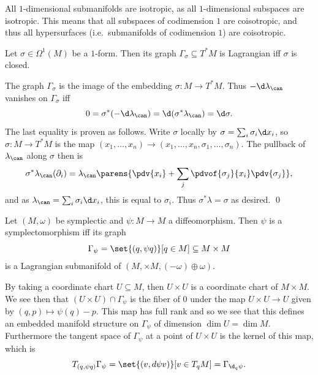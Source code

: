 \eexam

\bexam

    All $1$-dimensional submanifolds are isotropic, as all $1$-dimensional subspaces are isotropic.
    This means that all subspaces of codimension $1$ are coisotropic, and thus all hypersurfaces (i.e.\ submanifolds of codimension $1$) are coisotropic.

\eexam

\bprop[name={closedformlagrange}]

    Let $\sigma\in\Omega^1(M)$ be a $1$-form.
    Then its graph $\Gamma_\sigma\subseteq T^*M$ is Lagrangian iff $\sigma$ is closed.

\eprop

\bproof

    The graph $\Gamma_\sigma$ is the image of the embedding $\sigma\colon M\to T^*M$.
    Thus $-\d\lambda_\can$ vanishes on $\Gamma_\sigma$ iff
    $$ 0 = \sigma^*(-\d\lambda_\can) = \d(\sigma^*\lambda_\can) = \d\sigma . $$
    The last equality is proven as follows.
    Write $\sigma$ locally by $\sigma=\sum_i\sigma_i\d x_i$, so $\sigma\colon M\to T^*M$ is the map $(x_1,\dots,x_n)\to(x_1,\dots,x_n,\sigma_1,\dots,\sigma_n)$.
    The pullback of $\lambda_\can$ along $\sigma$ then is
    $$ \sigma^*\lambda_\can(\partial_i) = \lambda_\can\parens{\pdv{x_i} + \sum_j \pdvof{\sigma_j}{x_i}\pdv{\sigma_j}} , $$
    and as $\lambda_\can=\sum_i\sigma_i\d x_i$, this is equal to $\sigma_i$.
    Thus $\sigma^*\lambda=\sigma$ as desired.
    \qed

\eproof

\bprop[name={symplagrange}]

    Let $(M,\omega)$ be symplectic and $\psi\colon M\to M$ a diffeomorphism.
    Then $\psi$ is a symplectomorphism iff its graph
    $$ \Gamma_\psi = \set{(q,\psi q)}[q\in M] \subseteq M\times M $$
    is a Lagrangian submanifold of $(M,\times M,(-\omega)\oplus\omega)$.

\eprop

\bproof

    By taking a coordinate chart $U\subseteq M$, then $U\times U$ is a coordinate chart of $M\times M$.
    We see then that $(U\times U)\cap\Gamma_\psi$ is the fiber of $0$ under the map $U\times U\to U$ given by $(q,p)\mapsto \psi(q)-p$.
    This map has full rank and so we see that this defines an embedded manifold structure on $\Gamma_\psi$ of dimension $\dim U=\dim M$.
    Furthermore the tangent space of $\Gamma_\psi$ at a point of $U\times U$ is the kernel of this map, which is
    $$ T_{(q,\psi q)}\Gamma_\psi = \set{(v,d\psi v)}[v\in T_qM] = \Gamma_{\d_q\psi} . $$

